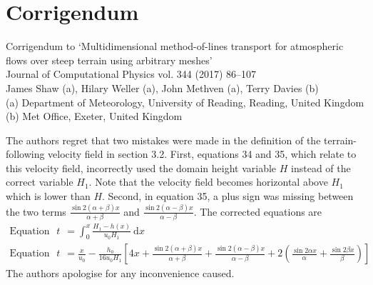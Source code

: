 \documentclass[a4]{article}
\begin{document}
\section*{Corrigendum}

Corrigendum to `Multidimensional method-of-lines transport for atmospheric flows over steep terrain using arbitrary meshes' \\
Journal of Computational Physics vol. 344 (2017) 86--107 \\
James Shaw (a), Hilary Weller (a), John Methven (a), Terry Davies (b) \\
(a) Department of Meteorology, University of Reading, Reading, United Kingdom
(b) Met Office, Exeter, United Kingdom

\vspace{1em}
The authors regret that two mistakes were made in the definition of the terrain-following velocity field in section 3.2.  First, equations 34 and 35, which relate to this velocity field, incorrectly used the domain height variable $H$ instead of the correct variable $H_1$.  Note that the velocity field becomes horizontal above $H_1$ which is lower than $H$.  Second, in equation 35, a plus sign was missing between the two terms $\frac{\sin 2 (\alpha + \beta) x}{\alpha + \beta}$ and $\frac{\sin 2(\alpha - \beta) x}{\alpha - \beta}$.
The corrected equations are
\begin{align*}
\text{Equation 34: }t &= \int_0^x \frac{H_1 - h(x)}{u_0 H_1}\:\mathrm{d}x \\
\text{Equation 35: }t &= \frac{x}{u_0} - \frac{h_0}{16 u_0 H_1} \left[ 4x + \frac{\sin 2 (\alpha + \beta) x}{\alpha + \beta} + \frac{\sin 2(\alpha - \beta) x}{\alpha - \beta} + 2 \left( \frac{\sin 2\alpha x}{\alpha}  + \frac{\sin 2\beta x}{\beta} \right) \right]
\end{align*}
The authors apologise for any inconvenience caused.
\end{document}
